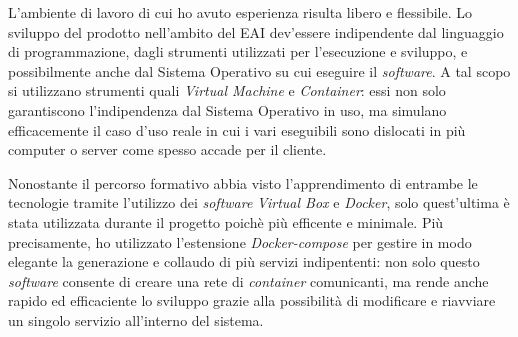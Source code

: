 L'ambiente di lavoro di cui ho avuto esperienza risulta libero e flessibile.
Lo sviluppo del prodotto nell'ambito del EAI dev'essere indipendente dal linguaggio di programmazione, dagli strumenti utilizzati per l'esecuzione e sviluppo, e possibilmente anche dal Sistema Operativo su cui eseguire il \textit{software}.
A tal scopo si utilizzano strumenti quali \textit{Virtual Machine} e \textit{Container}: essi non solo garantiscono l'indipendenza dal Sistema Operativo in uso, ma simulano efficacemente il caso d'uso reale in cui i vari eseguibili sono dislocati in più computer o server come spesso accade per il cliente.

Nonostante il percorso formativo abbia visto l'apprendimento di entrambe le tecnologie tramite l'utilizzo dei \textit{software} \textit{Virtual Box} e \textit{Docker}, solo quest'ultima è stata utilizzata durante il progetto poichè più efficente e minimale.
Più precisamente, ho utilizzato l'estensione \textit{Docker-compose} per gestire in modo elegante la generazione e collaudo di più servizi indipententi: non solo questo \textit{software} consente di creare una rete di \textit{container} comunicanti, ma rende anche rapido ed efficaciente lo sviluppo grazie alla possibilità di modificare e riavviare un singolo servizio all'interno del sistema.
